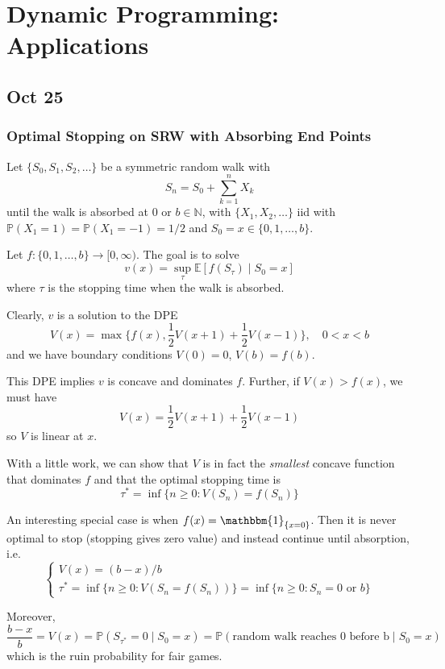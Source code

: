 \documentclass[12pt]{report}
\renewcommand{\P}{\mathbb{P}}
\newcommand{\E}{\mathbb{E}}
\newcommand{\N}{\mathbb{N}}
\newcommand{\ind}{\mathbbm{1}}
\begin{document}
\chapter{Dynamic Programming: Applications}
\section*{Oct 25}
\subsection*{Optimal Stopping on SRW with Absorbing End Points} 

    Let $\{S_0, S_1, S_2, \dots\}$ be a symmetric random walk with 
    \[S_n = S_0 + \sum_{k=1}^{n} X_k\] 
    until the walk is absorbed at $0$ or $b \in \N$, with $\{X_1, X_2, \dots\}$ iid with $\P(X_1 = 1) = \P(X_1 = -1) = 1/2$ and $S_0 = x \in \{0, 1, \dots, b\}$. 
    
    Let $f: \{0, 1, \dots, b\} \to [0, \infty)$. The goal is to solve 
    \[v(x) = \sup_{\tau} \E[f(S_{\tau}) \; | \; S_0 = x]\]
    where $\tau$ is the stopping time when the walk is absorbed.

    Clearly, $v$ is a solution to the DPE 
    \[V(x) = \max\{f(x), \frac{1}{2}V(x + 1) + \frac{1}{2}V(x  -1)\}, \quad 0 < x < b\]
    and we have boundary conditions $V(0) =0$, $V(b) = f(b)$.

    This DPE implies $v$ is concave and dominates $f$. Further, if $V(x) > f(x)$, we must have 
    \[V(x) = \frac{1}{2}V(x +1) + \frac{1}{2}V(x - 1)\] 
    so $V$ is linear at $x$. 

    With a little work, we can show that $V$ is in fact the \emph{smallest} concave function that dominates $f$ and that the optimal stopping time is 
    \[\tau^* = \inf\{n \geq 0: V(S_n) = f(S_n)\}\]

    An interesting special case is when $f(x) = \ind_{\{x = 0\}}$. Then it is never optimal to stop (stopping gives zero value) and instead continue until absorption, i.e. 
    \[\begin{cases}
        V(x) = (b - x) / b\\ 
        \tau^* = \inf\{n \geq 0: V(S_n = f(S_n))\} = \inf\{n \geq 0: S_n = 0 \text{ or } b\} 
    \end{cases}\]

    Moreover,
    \[\frac{b - x}{b} = V(x) = \P(S_{\tau^*} = 0 \; | \; S_0 = x) = \P(\text{random walk reaches 0 before b} \; | \; S_0 = x)\]
    which is the ruin probability for fair games. 
\end{document}
